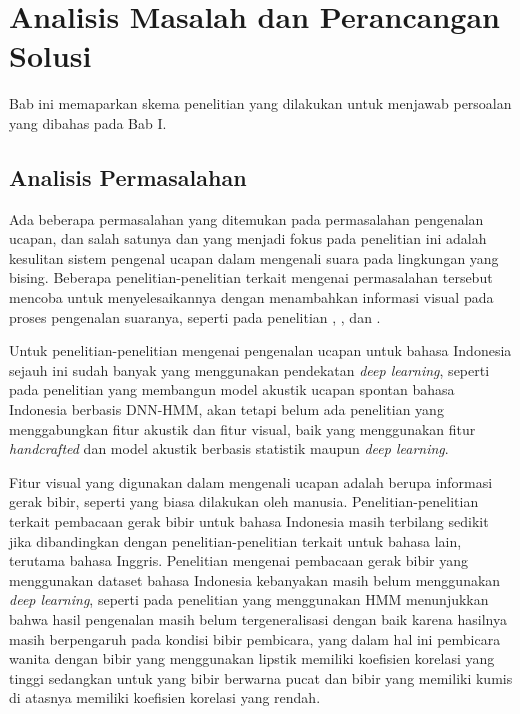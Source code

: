 \chapter{Analisis Masalah dan Perancangan Solusi}

Bab ini memaparkan skema penelitian yang dilakukan untuk menjawab persoalan yang dibahas pada Bab I.

\section{Analisis Permasalahan}

Ada beberapa permasalahan yang ditemukan pada permasalahan pengenalan ucapan, dan salah satunya dan yang menjadi fokus pada penelitian ini adalah kesulitan sistem pengenal ucapan dalam mengenali suara pada lingkungan yang bising. Beberapa penelitian-penelitian terkait mengenai permasalahan tersebut mencoba untuk menyelesaikannya dengan menambahkan informasi visual pada proses pengenalan suaranya, seperti pada penelitian \textcite{Chung2017}, \textcite{Chung2016}, dan \textcite{Assael2016}.
\bigskip

Untuk penelitian-penelitian mengenai pengenalan ucapan untuk bahasa Indonesia sejauh ini sudah banyak yang menggunakan pendekatan \textit{deep learning}, seperti pada penelitian \textcite{Yuwan2018} yang membangun model akustik ucapan spontan bahasa Indonesia berbasis DNN-HMM, akan tetapi belum ada penelitian yang menggabungkan fitur akustik dan fitur visual, baik yang menggunakan fitur \textit{handcrafted} dan model akustik berbasis statistik maupun \textit{deep learning}.
\bigskip

Fitur visual yang digunakan dalam mengenali ucapan adalah berupa informasi gerak bibir, seperti yang biasa dilakukan oleh manusia. Penelitian-penelitian terkait pembacaan gerak bibir untuk bahasa Indonesia masih terbilang sedikit jika dibandingkan dengan penelitian-penelitian terkait untuk bahasa lain, terutama bahasa Inggris. Penelitian mengenai pembacaan gerak bibir yang menggunakan dataset bahasa Indonesia kebanyakan masih belum menggunakan \textit{deep learning}, seperti pada penelitian \textcite{Achmad2015} yang menggunakan HMM menunjukkan bahwa hasil pengenalan masih belum tergeneralisasi dengan baik karena hasilnya masih berpengaruh pada kondisi bibir pembicara, yang dalam hal ini pembicara wanita dengan bibir yang menggunakan lipstik memiliki koefisien korelasi yang tinggi sedangkan untuk yang bibir berwarna pucat dan bibir yang memiliki kumis di atasnya memiliki koefisien korelasi yang rendah.
\bigskip


